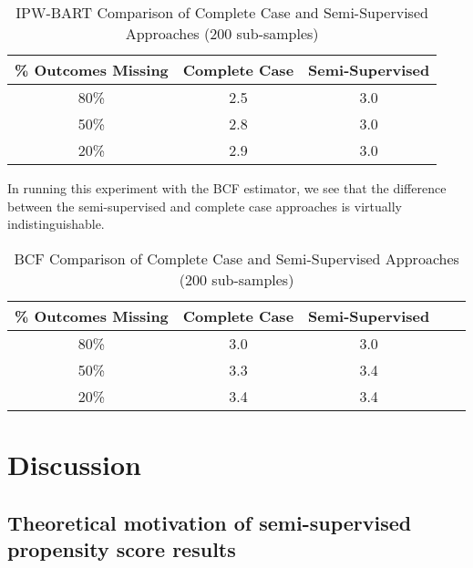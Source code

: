 \documentclass[aos]{imsart}
\begin{document}
\begin{table}[ht]
\centering
\begingroup\small
\begin{tabular}{ccc}
  \hline
\% Outcomes Missing & Complete Case & Semi-Supervised \\ 
  \hline
80\% & 2.5 & 3.0 \\ 
50\% & 2.8 & 3.0 \\ 
20\% & 2.9 & 3.0 \\ 
   \hline
\end{tabular}
\endgroup
\caption{IPW-BART Comparison of Complete Case and Semi-Supervised Approaches (200 sub-samples)} 
\end{table}

In running this experiment with the BCF estimator, we see that the difference between the semi-supervised and complete case approaches is virtually indistinguishable. 

\begin{table}[ht]
\centering
\begingroup\small
\begin{tabular}{ccccc}
  \hline
\% Outcomes Missing & Complete Case & Semi-Supervised \\ 
  \hline
80\% & 3.0 & 3.0 \\ 
50\% & 3.3 & 3.4 \\ 
20\% & 3.4 & 3.4 \\ 
   \hline
\end{tabular}
\endgroup
\caption{BCF Comparison of Complete Case and Semi-Supervised Approaches (200 sub-samples)} 
\end{table}

\newpage
\section{Discussion}

\subsection{Theoretical motivation of semi-supervised propensity score results}
\label{subsection:theoretical}
\end{document}
